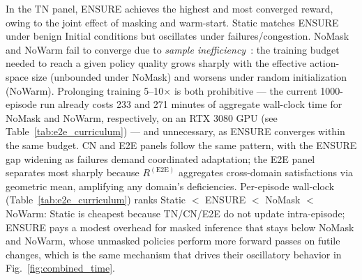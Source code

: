 \documentclass[12pt,lettersize,journal,onecolumn]{IEEEtran}
\begin{document}
In the TN panel, ENSURE achieves the highest and most converged reward, owing to the joint effect of masking and warm-start. Static matches ENSURE under benign Initial conditions but oscillates under failures/congestion. NoMask and NoWarm fail to converge due to \emph{sample inefficiency}~\cite{marl24albrecht}: the training budget needed to reach a given policy quality grows sharply with the effective action-space size (unbounded under NoMask) and worsens under random initialization (NoWarm). Prolonging training 5--10$\times$ is both prohibitive — the current 1000-episode run already costs 233 and 271 minutes of aggregate wall-clock time for NoMask and NoWarm, respectively, on an RTX 3080 GPU (see Table~\ref{tab:e2e_curriculum}) — and unnecessary, as ENSURE converges within the same budget. CN and E2E panels follow the same pattern, with the ENSURE gap widening as failures demand coordinated adaptation; the E2E panel separates most sharply because $R^{(\mathrm{E2E})}$ aggregates cross-domain satisfactions via geometric mean, amplifying any domain's deficiencies. Per-episode wall-clock (Table~\ref{tab:e2e_curriculum}) ranks Static $<$ ENSURE $<$ NoMask $<$ NoWarm: Static is cheapest because TN/CN/E2E do not update intra-episode; ENSURE pays a modest overhead for masked inference that stays below NoMask and NoWarm, whose unmasked policies perform more forward passes on futile changes, which is the same mechanism that drives their oscillatory behavior in Fig.~\ref{fig:combined_time}.
\end{document}
